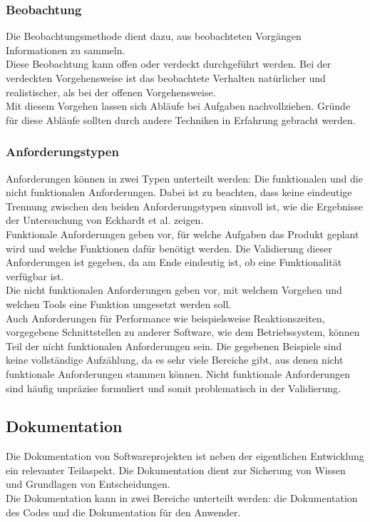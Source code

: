 \subsubsection{Beobachtung}
\label{Beobachtung}
Die Beobachtungsmethode dient dazu, aus beobachteten Vorgängen Informationen zu sammeln. \\
Diese Beobachtung kann offen oder verdeckt durchgeführt werden. Bei der verdeckten Vorgehensweise ist das beobachtete Verhalten natürlicher und realistischer, als bei der offenen Vorgehensweise\cite{silhavy2011requirements}. \\
Mit diesem Vorgehen lassen sich Abläufe bei Aufgaben nachvollziehen. Gründe für diese Abläufe sollten durch andere Techniken in Erfahrung gebracht werden.\\
\subsubsection{Anforderungstypen}
\label{Anforderungstypen}
Anforderungen können in zwei Typen unterteilt werden: Die funktionalen und die nicht funktionalen Anforderungen. Dabei ist zu beachten, dass keine eindeutige Trennung zwischen den beiden Anforderungstypen sinnvoll ist, wie die Ergebnisse der Untersuchung von Eckhardt et al. zeigen\cite{10.1145/2884781.2884788}.
\\Funktionale Anforderungen geben vor, für welche Aufgaben das Produkt geplant wird und welche Funktionen dafür benötigt werden. Die Validierung dieser Anforderungen ist gegeben, da am Ende eindeutig ist, ob eine Funktionalität verfügbar ist. \\
Die nicht funktionalen Anforderungen geben vor, mit welchem Vorgehen und welchen Tools eine Funktion umgesetzt werden soll\cite{10.1145/2884781.2884788}. \\
Auch Anforderungen für Performance wie beispielsweise Reaktionszeiten, vorgegebene Schnittstellen zu anderer Software, wie dem Betriebssystem, können Teil der nicht funktionalen Anforderungen sein\cite{10.1145/2884781.2884788}. 
Die gegebenen Beispiele sind keine vollständige Aufzählung, da es sehr viele Bereiche gibt, aus denen nicht funktionale Anforderungen stammen können.
Nicht funktionale Anforderungen sind häufig unpräzise formuliert und somit problematisch in der Validierung\cite{10.1145/2884781.2884788}.
\subsection{Dokumentation}
\label{Dokumenation}
Die Dokumentation von Softwareprojekten ist neben der eigentlichen Entwicklung ein relevanter Teilaspekt. Die Dokumentation dient zur Sicherung von Wissen und Grundlagen von Entscheidungen. \\
Die Dokumentation kann in zwei Bereiche unterteilt werden: die Dokumentation des Codes und die Dokumentation für den Anwender\cite{THEUNISSEN2022106733}.\\
